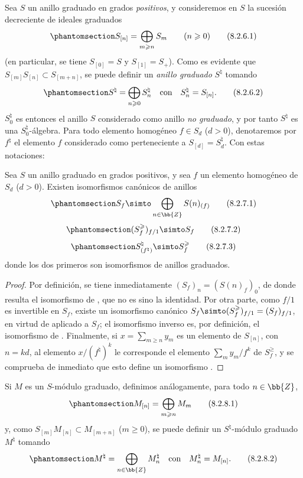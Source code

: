 \documentclass[oneside,10pt]{amsart}
\renewcommand{\geq}{\geqslant}
\newcommand{\oldpage}[2][]{\marginnote{\normalfont\footnotesize\textbf{#1}~|~#2}\ignorespaces}
\let\EGAOriginalLabel\label
\renewcommand{\label}[1]{\phantomsection\EGAOriginalLabel{#1}}
\begin{document}
\begin{env}[8.2.6]
\label{II.8.2.6}
Sea $S$ un anillo graduado en grados \emph{positivos}, y consideremos en $S$ la sucesión decreciente de ideales graduados
\[
\label{II.8.2.6.1}
  S_{[n]} = \bigoplus_{m\geq n} S_m
  \qquad\mbox{($n\geq0$)}
\tag{8.2.6.1}
\]
(en particular, se tiene $S_{[0]}=S$ y $S_{[1]}=S_+$).
Como es evidente que $S_{[m]}S_{[n]}\subset S_{[m+n]}$, se puede definir un \emph{anillo graduado} $S^\natural$ tomando
\[
\label{II.8.2.6.2}
  S^\natural = \bigoplus_{n\geq0} S_n^\natural
  \quad
  \text{con}
  \quad
  S_n^\natural = S_{[n]}.
\tag{8.2.6.2}
\]
$S_0^\natural$ es entonces el anillo $S$ considerado como anillo \emph{no graduado}, y por tanto $S^\natural$ es una $S_0^\natural$-álgebra.
Para todo elemento homogéneo $f\in S_d$ ($d>0$), denotaremos por $f^\natural$ el elemento $f$ considerado como perteneciente a $S_{[d]}=S_d^\natural$.
Con estas notaciones:
\end{env}

\oldpage[II]{159}
\begin{lemma}[8.2.7]
\label{II.8.2.7}
Sea $S$ un anillo graduado en grados positivos, y sea $f$ un elemento homogéneo de $S_d$ ($d>0$).
Existen isomorfismos canónicos de anillos
\[
\label{II.8.2.7.1}
  S_f \simto \bigoplus_{n\in\bb{Z}} S(n)_{(f)}
\tag{8.2.7.1}
\]
\[
\label{II.8.2.7.2}
  (S_f^\geq)_{f/1} \simto S_f
\tag{8.2.7.2}
\]
\[
\label{II.8.2.7.3}
  S_{(f^\natural)}^\natural \simto S_f^\geq
\tag{8.2.7.3}
\]
donde los dos primeros son isomorfismos de anillos graduados.
\end{lemma}

\begin{proof}
Por definición, se tiene inmediatamente $(S_f)_n=(S(n)_f)_0$, de donde resulta el isomorfismo de , que no es sino la identidad.
Por otra parte, como $f/1$ es invertible en $S_f$, existe un isomorfismo canónico $S_f\simto(S_f^\geq)_{f/1}=(S_f)_{f/1}$, en virtud de  aplicado a $S_f$;
el isomorfismo inverso es, por definición, el isomorfismo de .
Finalmente, si $x=\sum_{m\geq n}y_m$ es un elemento de $S_{[n]}$, con $n=kd$, al elemento $x/(f^\natural)^k$ le corresponde el elemento $\sum_m y_m/f^k$ de $S_f^\geq$, y se comprueba de inmediato que esto define un isomorfismo .
\end{proof}

\begin{env}[8.2.8]
\label{II.8.2.8}
Si $M$ es un $S$-módulo graduado, definimos análogamente, para todo $n\in\bb{Z}$,
\[
\label{II.8.2.8.1}
  M_{[n]} = \bigoplus_{m\geq n} M_m
\tag{8.2.8.1}
\]
y, como $S_{[m]}M_{[n]} \subset M_{[m+n]}$ ($m\geq0$), se puede definir un $S^\natural$-módulo graduado $M^\natural$ tomando
\[
\label{II.8.2.8.2}
  M^\natural = \bigoplus_{n\in\bb{Z}} M_n^\natural
  \quad
  \text{con}
  \quad
  M_n^\natural = M_{[n]}.
\tag{8.2.8.2}
\]
\end{env}
\end{document}
